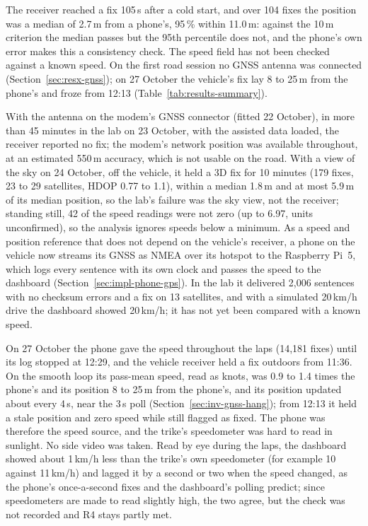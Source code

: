 The receiver reached a fix 105\,s after a cold start, and over 104 fixes the position was a median of 2.7\,m from a phone's, 95\,\% within 11.0\,m: against the 10\,m criterion the median passes but the 95th percentile does not, and the phone's own error makes this a consistency check. The speed field has not been checked against a known speed. On the first road session no GNSS antenna was connected (Section~\ref{sec:resx-gnss}); on 27 October the vehicle's fix lay 8 to 25\,m from the phone's and froze from 12:13 (Table~\ref{tab:results-summary}).

With the antenna on the modem's GNSS connector (fitted 22 October), in more than 45 minutes in the lab on 23 October, with the assisted data loaded, the receiver reported no fix; the modem's network position was available throughout, at an estimated 550\,m accuracy, which is not usable on the road. With a view of the sky on 24 October, off the vehicle, it held a 3D fix for 10 minutes (179 fixes, 23 to 29 satellites, HDOP 0.77 to 1.1), within a median 1.8\,m and at most 5.9\,m of its median position, so the lab's failure was the sky view, not the receiver; standing still, 42 of the speed readings were not zero (up to 6.97, units unconfirmed), so the analysis ignores speeds below a minimum. As a speed and position reference that does not depend on the vehicle's receiver, a phone on the vehicle now streams its GNSS as NMEA over its hotspot to the Raspberry Pi~5, which logs every sentence with its own clock and passes the speed to the dashboard (Section~\ref{sec:impl-phone-gps}). In the lab it delivered 2,006 sentences with no checksum errors and a fix on 13 satellites, and with a simulated 20\,km/h drive the dashboard showed 20\,km/h; it has not yet been compared with a known speed.

On 27 October the phone gave the speed throughout the laps (14,181 fixes) until its log stopped at 12:29, and the vehicle receiver held a fix outdoors from 11:36. On the smooth loop its pass-mean speed, read as knots, was 0.9 to 1.4 times the phone's and its position 8 to 25\,m from the phone's, and its position updated about every 4\,s, near the 3\,s poll (Section~\ref{sec:inv-gnss-hang}); from 12:13 it held a stale position and zero speed while still flagged as fixed. The phone was therefore the speed source, and the trike's speedometer was hard to read in sunlight. No side video was taken. Read by eye during the laps, the dashboard showed about 1\,km/h less than the trike's own speedometer (for example 10 against 11\,km/h) and lagged it by a second or two when the speed changed, as the phone's once-a-second fixes and the dashboard's polling predict; since speedometers are made to read slightly high, the two agree, but the check was not recorded and R4 stays partly met.

